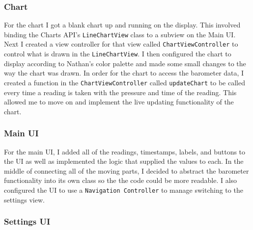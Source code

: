 \documentclass[onecolumn, draftclsnofoot,10pt, compsoc]{IEEEtran}
\begin{document}
    \subsubsection{Chart}
        For the chart I got a blank chart up and running on the display. This involved binding the Charts API's \texttt{LineChartView} class to a subview on the Main UI.
        Next I created a view controller for that view called \texttt{ChartViewController} to control what is drawn in the \texttt{LineChartView}.
        I then configured the chart to display according to Nathan's color palette and made some small changes to the way the chart was drawn.
        In order for the chart to access the barometer data, I created a function in the \texttt{ChartViewController} called \texttt{updateChart} to be called every time a reading is taken with the pressure and time of the reading.
        This allowed me to move on and implement the live updating functionality of the chart.

    \subsubsection{Main UI}
        For the main UI, I added all of the readings, timestamps, labels, and buttons to the UI as well as implemented the logic that supplied the values to each.
        In the middle of connecting all of the moving parts, I decided to abstract the barometer functionality into its own class so the the code could be more readable.
        I also configured the UI to use a \texttt{Navigation Controller} to manage switching to the settings view.

    \subsubsection{Settings UI}
\end{document}
